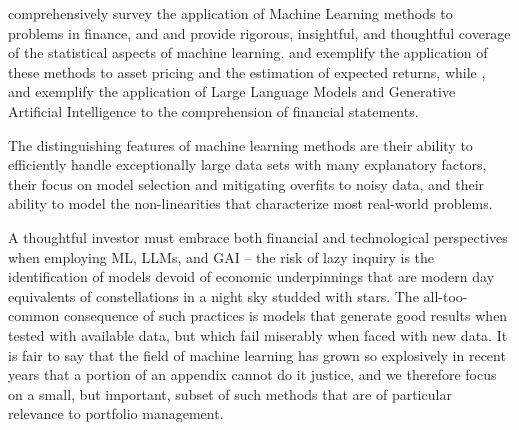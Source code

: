 \documentclass[graybox,envcountchap,sectrefs]{svmono}\usepackage[]{graphicx}\usepackage[]{xcolor}
\begin{document}
\begin{appendices}
\citet{KellyXiu2023} comprehensively survey the application of Machine
Learning methods to problems in finance, and \citet{HastieTibshiraniFriedman2009}
and \citet{JWHTStatLearning2013} provide rigorous, insightful, and
thoughtful coverage of the statistical aspects of machine learning.
\citet{GuKellyXiu2020} and \citet{CaoJiangWangYang2024} exemplify
the application of these methods to asset pricing and the estimation
of expected returns, while \citet{KimMuhnNikolaev2023}, \citet{KimMuhnNikolaev2024a}
and \citet{KimMuhnNikolaev2024b} exemplify the application of Large
Language Models and Generative Artificial Intelligence to the comprehension
of financial statements.

The distinguishing features of machine learning methods are their
ability to efficiently handle exceptionally large data sets with many
explanatory factors, their focus on model selection and mitigating
overfits to noisy data, and their ability to model the non-linearities
that characterize most real-world problems.

A thoughtful investor must embrace both financial and technological
perspectives when employing ML, LLMs, and GAI -- the risk of lazy
inquiry is the identification of models devoid of economic underpinnings
that are modern day equivalents of constellations in a night sky studded
with stars. The all-too-common consequence of such practices is models
that generate good results when tested with available data, but which
fail miserably when faced with new data. It is fair to say that the
field of machine learning has grown so explosively in recent years
that a portion of an appendix cannot do it justice, and we therefore
focus on a small, but important, subset of such methods that are of
particular relevance to portfolio management.


\end{appendices}
\end{document}
